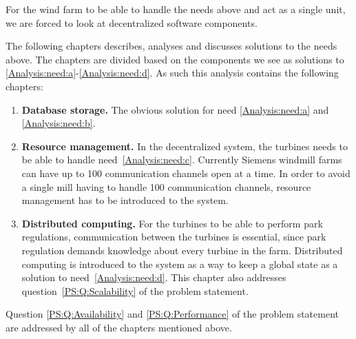 For the wind farm to be able to handle the needs above and act as a single unit, we are forced to look at decentralized software components. 

The following chapters describes, analyses and discusses solutions to the needs above. The chapters are divided based on the components we see as solutions to \ref{Analysis:need:a}-\ref{Analysis:need:d}. As such this analysis contains the following chapters:

\begin{enumerate}[label=2.\arabic*]
\item{\textbf{Database storage.}} The obvious solution for need \ref{Analysis:need:a} and \ref{Analysis:need:b}.
\item{\textbf{Resource management.}} In the decentralized system, the turbines needs to be able to handle need~\ref{Analysis:need:c}. Currently Siemens windmill farms can have up to 100 communication channels open at a time. In order to avoid a single mill having to handle 100 communication channels, resource management has to be introduced to the system.
\item{\textbf{Distributed computing.}} For the turbines to be able to perform park regulations, communication between the turbines is essential, since park regulation demands knowledge about every turbine in the farm. Distributed computing is introduced to the system as a way to keep a global state as a solution to need~\ref{Analysis:need:d}. This chapter also addresses question~\ref{PS:Q:Scalability} of the problem statement.
\end{enumerate}

Question \ref{PS:Q:Availability} and \ref{PS:Q:Performance} of the problem statement are addressed by all of the chapters mentioned above.

%
%
%
%
%
%





